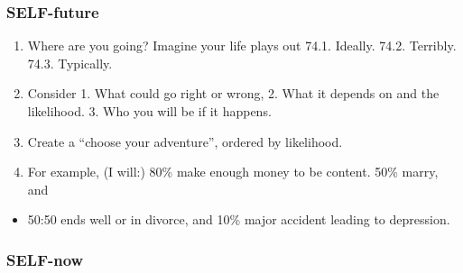 \documentclass[
]{book}
\providecommand{\tightlist}{%
  \setlength{\itemsep}{0pt}\setlength{\parskip}{0pt}}
\begin{document}
\subsubsection{SELF-future}\label{self-future}

\begin{enumerate}
\def\labelenumi{\arabic{enumi}.}
\setcounter{enumi}{73}
\tightlist
\item
  Where are you going? Imagine your life plays out
  74.1. Ideally.
  74.2. Terribly.
  74.3. Typically.
\item
  Consider 1. What could go right or wrong, 2. What it depends on and the
  likelihood. 3. Who you will be if it happens.
\item
  Create a ``choose your adventure'', ordered by likelihood.
\item
  For example, (I will:) 80\% make enough money to be content. 50\% marry, and
\end{enumerate}

\begin{itemize}
\tightlist
\item
  50:50 ends well or in divorce, and 10\% major accident leading to depression.
\end{itemize}

\subsubsection{SELF-now}\label{self-now}
\end{document}
